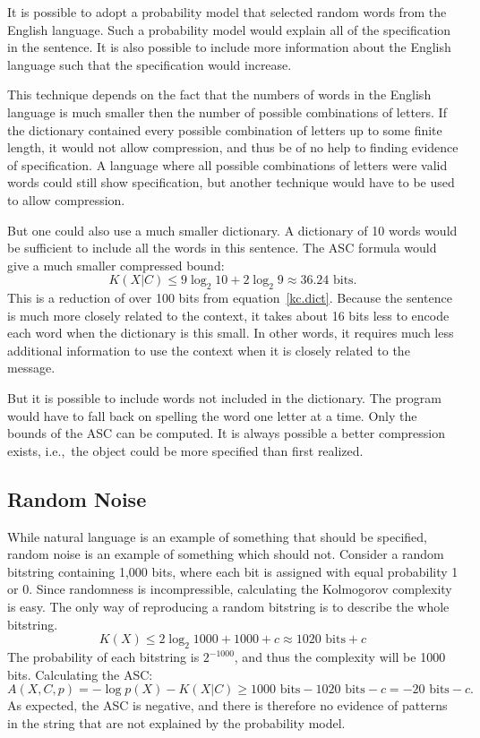 It is possible to adopt a probability model that selected random words from the English language.
Such a probability model would explain all of the specification in the sentence.
It is also possible to include more information about the English language such that the specification would increase.

This technique depends on the fact that the numbers of words in the English language is much smaller then the number of possible combinations of letters.
If the dictionary contained every possible combination of letters up to some finite length, it would not allow compression, and thus be of no help to finding evidence of specification.
A language where all possible combinations of letters were valid words could still show specification, but another technique would have to be used to allow compression.

But one could also use a much smaller dictionary.
A dictionary of 10 words would be sufficient to include all the words in this sentence.
The ASC formula would give a much smaller compressed bound:
\begin{equation}
    K(X|C) \leq 9 \log_2 10 + 2 \log_2 9 \approx 36.24 \mbox{ bits.}
\end{equation}
This is a reduction of over 100 bits from equation~\ref{kc.dict}.
Because the sentence is much more closely related to the context,
it takes about 16 bits less to encode each word when the dictionary is this small.
In other words, it requires much less additional information to use the context when it is closely related to the message.

But it is possible to include words not included in the dictionary.
The program would have to fall back on spelling the word one letter at a time.
Only the bounds of the ASC can be computed.
It is always possible a better compression exists, i.e.,\ the object could be more specified than first realized.

\subsection{Random Noise}
While natural language is an example of something that should be specified, random noise is an example of something which should not.
Consider a random bitstring containing 1,000 bits, where each bit is assigned with equal probability 1 or 0.
Since randomness is incompressible, calculating the Kolmogorov complexity is easy.
The only way of reproducing a random bitstring is to describe the whole bitstring.
\begin{equation}
    K(X) \leq 2 \log_2 1000 + 1000 + c \approx 1020 \mbox{ bits} + c
\end{equation}
The probability of each bitstring is $2^{-1000}$, and thus the complexity will be 1000 bits.
Calculating the ASC:
\begin{equation}
    A(X,C,p) = - \log p(X) - K(X|C) \geq 1000 \mbox{ bits} - 1020 \mbox{ bits} - c = -20 \mbox{ bits} - c \mbox{.}
\end{equation}
As expected, the ASC is negative, and there is therefore no evidence of patterns in the string that are not explained by the probability model.

